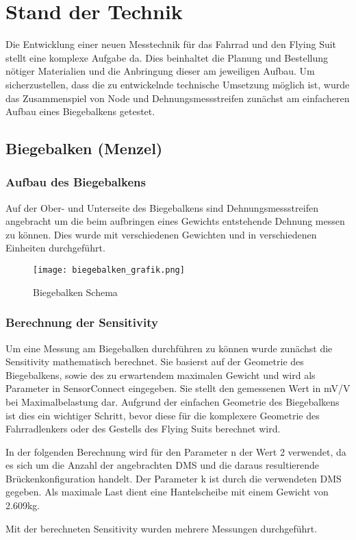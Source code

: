 \chapter{Stand der Technik}
Die Entwicklung einer neuen Messtechnik für das Fahrrad und den Flying Suit stellt eine komplexe Aufgabe da.
Dies beinhaltet die Planung und Bestellung nötiger Materialien und die Anbringung dieser am jeweiligen Aufbau.
Um sicherzustellen, dass die zu entwickelnde technische Umsetzung möglich ist, wurde das Zusammenspiel von Node und Dehnungsmessstreifen zunächst am einfacheren Aufbau eines Biegebalkens getestet.


\section{Biegebalken (Menzel)}
\subsection{Aufbau des Biegebalkens}
Auf der Ober- und Unterseite des Biegebalkens sind Dehnungsmessstreifen angebracht um die beim aufbringen eines Gewichts entstehende Dehnung messen zu können.
Dies wurde mit verschiedenen Gewichten und in verschiedenen Einheiten durchgeführt.
\begin{figure}[h]
    \begin{center}
        \texttt{[image: biegebalken\_grafik.png]}
        \caption[Biegebalken Schema (Abbildungsverzeichnis)]{Biegebalken Schema
        }
        \label{fig:biegebalkenschema}
    \end{center}
\end{figure}
\subsection{Berechnung der Sensitivity}
Um eine Messung am Biegebalken durchführen zu können wurde zunächst die Sensitivity mathematisch berechnet.
Sie basierst auf der Geometrie des Biegebalkens, sowie des zu erwartendem maximalen Gewicht und wird als Parameter in SensorConnect eingegeben.
Sie stellt den gemessenen Wert in mV/V bei Maximalbelastung dar.
Aufgrund der einfachen Geometrie des Biegebalkens ist dies ein wichtiger Schritt, bevor diese für die komplexere Geometrie des Fahrradlenkers oder des Gestells des Flying Suits berechnet wird.

In der folgenden Berechnung wird für den Parameter n der Wert 2 verwendet, da es sich um die Anzahl der angebrachten DMS und die daraus resultierende Brückenkonfiguration handelt.
Der Parameter k ist durch die verwendeten DMS gegeben. Als maximale Last dient eine Hantelscheibe mit einem Gewicht von 2.609kg.



Mit der berechneten Sensitivity wurden mehrere Messungen durchgeführt.